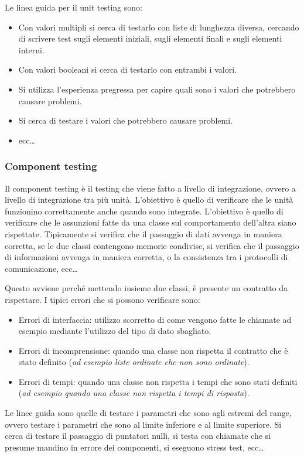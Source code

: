 Le linea guida per il unit testing sono:
\begin{itemize}
    \item Con valori multipli si cerca di testarlo con liste di lunghezza diversa,
    cercando di scrivere test sugli elementi iniziali, sugli elementi finali e sugli
    elementi interni.
    \item Con valori booleani si cerca di testarlo con entrambi i valori.
    \item Si utilizza l'esperienza pregressa per capire quali sono i valori che
    potrebbero causare problemi.
    \item Si cerca di testare i valori che potrebbero causare problemi.
    \item ecc\dots
\end{itemize}
\subsubsection{Component testing}
Il component testing è il testing che viene fatto a livello di integrazione,
ovvero a livello di integrazione tra più unità. L'obiettivo è quello di verificare
che le unità funzionino correttamente anche quando sono integrate.
L'obiettivo è quello di verificare che le assunzioni fatte da una classe sul comportamento
dell'altra siano rispettate.
Tipicamente si verifica che il passaggio di dati avvenga in maniera corretta, 
se le due classi contengono memorie condivise, si verifica che il passaggio di
informazioni avvenga in maniera corretta, o la consistenza tra i protocolli di
comunicazione, ecc\dots

Questo avviene perché mettendo insieme due classi, è presente un contratto da 
rispettare. I tipici errori che si possono verificare sono:
\begin{itemize}
    \item Errori di interfaccia: utilizzo scorretto di come vengono fatte le chiamate
    ad esempio mediante l'utilizzo del tipo di dato sbagliato.
    \item Errori di incomprensione: quando una classe non rispetta il contratto
    che è stato definito (\textit{ad esempio liste ordinate che non sono ordinate}).
    \item Errori di tempi: quando una classe non rispetta i tempi che sono stati
    definiti (\textit{ad esempio quando una classe non rispetta i tempi di risposta}).
\end{itemize}

Le linee guida sono quelle di testare i parametri che sono agli estremi del range,
ovvero testare i parametri che sono al limite inferiore e al limite superiore.
Si cerca di testare il passaggio di puntatori nulli, si testa con chiamate che si presume mandino in 
errore dei componenti, si eseguono stress test, ecc\dots

